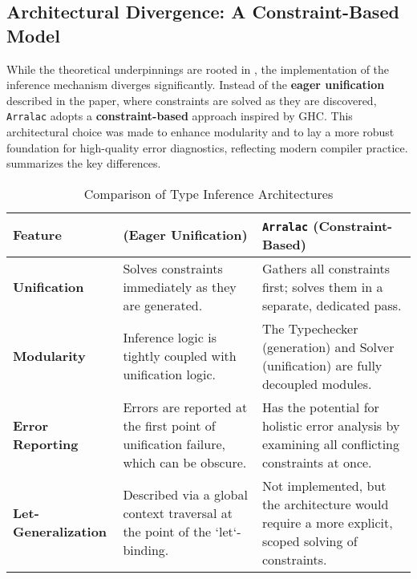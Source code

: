\subsection{Architectural Divergence: A Constraint-Based Model}
\label{sec:Design:ArralacApproach}

While the theoretical underpinnings are rooted in \cite{jones-practical-2007}, the implementation of the inference mechanism diverges significantly. Instead of the \textbf{eager unification} described in the paper, where constraints are solved as they are discovered, \texttt{Arralac} adopts a \textbf{constraint-based} approach inspired by GHC. This architectural choice was made to enhance modularity and to lay a more robust foundation for high-quality error diagnostics, reflecting modern compiler practice.  summarizes the key differences.

\begin{table}[h!]
    \centering
    \caption{Comparison of Type Inference Architectures}
    \label{tab:arch-comparison}
    \begin{tabular}{p{} p{} p{}}
        \toprule
        \textbf{Feature}            & \textbf{\cite{jones-practical-2007} (Eager Unification)}                             & \textbf{\texttt{Arralac} (Constraint-Based)}                                                        \\
        \midrule
        \textbf{Unification}        & Solves constraints immediately as they are generated.                                & Gathers all constraints first; solves them in a separate, dedicated pass.                           \\
        \textbf{Modularity}         & Inference logic is tightly coupled with unification logic.                           & The Typechecker (generation) and Solver (unification) are fully decoupled modules.                  \\
        \textbf{Error Reporting}    & Errors are reported at the first point of unification failure, which can be obscure. & Has the potential for holistic error analysis by examining all conflicting constraints at once.     \\
        \textbf{Let-Generalization} & Described via a global context traversal at the point of the `let`-binding.          & Not implemented, but the architecture would require a more explicit, scoped solving of constraints. \\
        \bottomrule
    \end{tabular}
\end{table}

